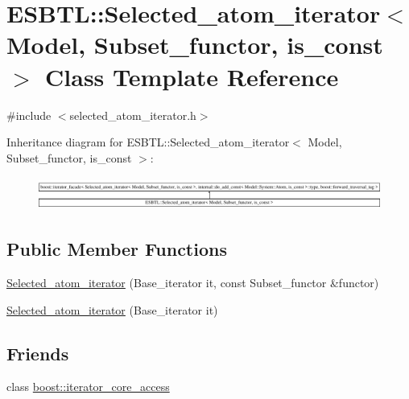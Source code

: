\hypertarget{classESBTL_1_1Selected__atom__iterator}{}\section{E\+S\+B\+TL\+:\+:Selected\+\_\+atom\+\_\+iterator$<$ Model, Subset\+\_\+functor, is\+\_\+const $>$ Class Template Reference}
\label{classESBTL_1_1Selected__atom__iterator}


{\ttfamily \#include $<$selected\+\_\+atom\+\_\+iterator.\+h$>$}

Inheritance diagram for E\+S\+B\+TL\+:\+:Selected\+\_\+atom\+\_\+iterator$<$ Model, Subset\+\_\+functor, is\+\_\+const $>$\+:\begin{figure}[H]
\begin{center}
\leavevmode
\includegraphics[height=1.084221cm]{classESBTL_1_1Selected__atom__iterator}
\end{center}
\end{figure}
\subsection*{Public Member Functions}
\begin{DoxyCompactItemize}
\item 
\hyperlink{classESBTL_1_1Selected__atom__iterator_a90cd448bdf3d57cd774c0bbcfbe402df}{Selected\+\_\+atom\+\_\+iterator} (Base\+\_\+iterator it, const Subset\+\_\+functor \&functor)
\item 
\hyperlink{classESBTL_1_1Selected__atom__iterator_aeabc4e8a95fca2d11566f7ad8caf31ed}{Selected\+\_\+atom\+\_\+iterator} (Base\+\_\+iterator it)
\end{DoxyCompactItemize}
\subsection*{Friends}
\begin{DoxyCompactItemize}
\item 
class \hyperlink{classESBTL_1_1Selected__atom__iterator_ac09f73e325921cc50ebcd96bed0f8096}{boost\+::iterator\+\_\+core\+\_\+access}
\end{DoxyCompactItemize}


